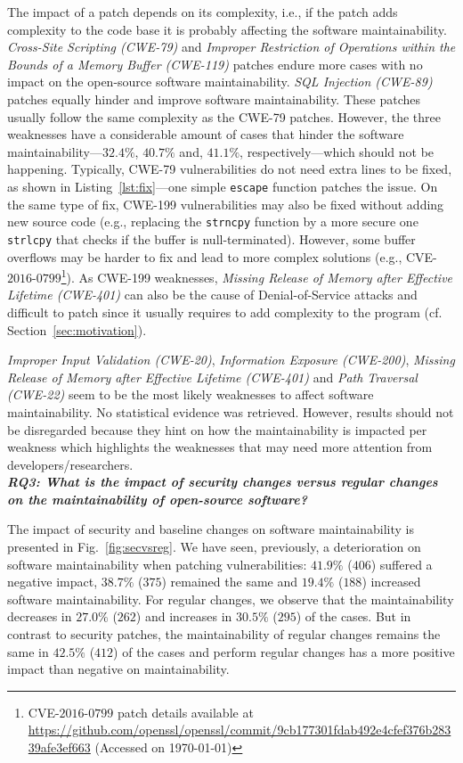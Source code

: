 \documentclass[smallextended]{svjour3}       %
\begin{document}
The impact of a patch depends on its complexity, i.e., if the patch
adds complexity to the code base it is probably affecting the software
maintainability. \emph{Cross-Site Scripting (CWE-79)} and 
\emph{Improper Restriction of Operations within the Bounds of 
a Memory Buffer (CWE-119)} patches endure more
cases with no impact on the open-source software maintainability. \emph{SQL Injection
(CWE-89)} patches equally hinder and improve software maintainability.
These patches usually follow the same complexity as the CWE-79 patches.
However, the three weaknesses have a considerable amount of cases that hinder
the software maintainability---$32.4\%$, $40.7\%$ and, $41.1\%$, respectively---which
should not be happening. Typically, CWE-79 vulnerabilities do not need extra lines 
to be fixed, as shown in Listing~\ref{lst:fix}---one simple 
\texttt{escape} function patches the issue. On the same type of fix,
CWE-199 vulnerabilities may also be fixed without adding new source code
(e.g., replacing the \texttt{strncpy} function by a more secure one 
\texttt{strlcpy} that checks if the buffer is null-terminated). However,
some buffer overflows may be harder to fix and lead to more complex 
solutions (e.g., 
CVE-$2016$-$0799$\footnote{CVE-$2016$-$0799$ patch details available at 
\url{https://github.com/openssl/openssl/commit/9cb177301fdab492e4cfef376b28339afe3ef663}
(Accessed on \today{})}). 
As CWE-199 weaknesses, \emph{Missing Release of Memory after Effective 
Lifetime (CWE-401)} can also be the cause of Denial-of-Service attacks and  
difficult to patch since it usually requires to add complexity to the program (cf. Section~\ref{sec:motivation}). 


\emph{Improper Input Validation (CWE-20)}, \emph{Information Exposure 
(CWE-200)}, \emph{Missing Release of Memory after Effective 
Lifetime (CWE-401)} and \emph{Path Traversal (CWE-22)} seem to be the most likely 
weaknesses to affect software maintainability. No statistical evidence was retrieved. However, results should not be disregarded because they hint on how 
the maintainability is impacted per weakness which highlights the weaknesses
that may need more attention from developers/researchers. 
%
\\\textit{\textbf{RQ3: What is the impact of security changes versus regular 
changes on the maintainability of open-source software?}}

The impact of security and baseline changes on software maintainability is presented in Fig.~\ref{fig:secvsreg}.  
We have seen, previously, a deterioration on software maintainability 
when patching vulnerabilities: $41.9\%$ ($406$) suffered a 
negative impact, $38.7\%$ ($375$) remained the same and $19.4\%$ 
($188$) increased software maintainability. For regular changes, 
we observe that the maintainability decreases in $27.0\%$ ($262$) 
and increases in $30.5\%$ ($295$) of the cases. But in contrast to 
security patches, the maintainability of regular changes remains the 
same in $42.5\%$ ($412$) of the cases and perform regular
changes has a more positive impact than negative on  
maintainability. 
\end{document}
